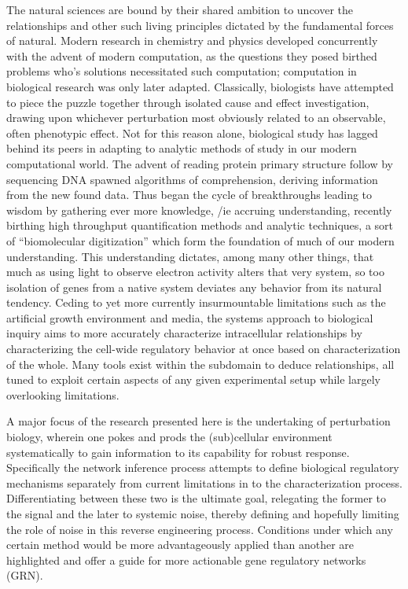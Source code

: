 The natural sciences are bound by their shared ambition to uncover the relationships and other such living principles dictated by the fundamental forces of natural. Modern research in chemistry and physics developed concurrently with the advent of modern computation, as the questions they posed birthed problems who's solutions necessitated such computation; computation in biological research was only later adapted. Classically, biologists have attempted to piece the puzzle together through isolated cause and effect investigation, drawing upon whichever perturbation most obviously related to an observable, often phenotypic effect. Not for this reason alone, biological study has lagged behind its peers in adapting to analytic methods of study in our modern computational world. The advent of reading protein primary structure follow by sequencing DNA spawned algorithms of comprehension, deriving information from the new found data. Thus began the cycle of breakthroughs leading to wisdom by gathering ever more knowledge, /ie accruing understanding, recently birthing high throughput quantification methods and analytic techniques, a sort of ``biomolecular digitization'' which form the foundation of much of our modern understanding. This understanding dictates, among many other things, that much as using light to observe electron activity alters that very system, so too isolation of genes from a native system deviates any behavior from its natural tendency. Ceding to yet more currently insurmountable limitations such as the artificial growth environment and media, the systems approach to biological inquiry aims to more accurately characterize intracellular relationships by characterizing the cell-wide regulatory behavior at once based on characterization of the whole. Many tools exist within the subdomain to deduce relationships, all tuned to exploit certain aspects of any given experimental setup while largely overlooking limitations. %

A major focus of the research presented here is the undertaking of perturbation biology, wherein one pokes and prods the (sub)cellular environment systematically to gain information to its capability for robust response. Specifically the network inference process attempts to define biological regulatory mechanisms separately from current limitations in to the characterization process. Differentiating between these two is the ultimate goal, relegating the former to the signal and the later to systemic noise, thereby defining and hopefully limiting the role of noise in this reverse engineering process. Conditions under which any certain method would be more advantageously applied than another are highlighted and offer a guide for more actionable gene regulatory networks (GRN). %

